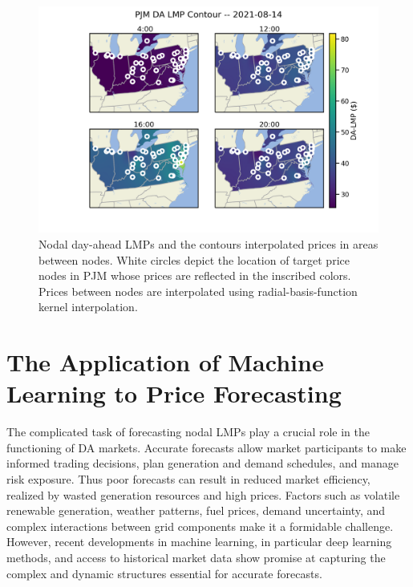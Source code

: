 \begin{figure}[htbp]
    \caption[Contour Map of PJM DA LMPs at various times on a single market-day ]{
        Nodal day-ahead LMPs and the contours interpolated prices in areas between nodes.
        White circles depict the location of target price nodes in PJM whose prices are reflected in the
        inscribed colors.
        Prices between nodes are interpolated using radial-basis-function kernel interpolation.
    }
    \begin{center}
        \setlength{\fboxsep}{0pt}%
        \setlength{\fboxrule}{1pt}%
        \includegraphics[width=150mm]{figs/pjm_lmp_contour_singlecbar}
    \end{center}
    \label{fig:contours}
\end{figure}

\section{The Application of Machine Learning to Price Forecasting}\label{sec:the-application-of-machine-learning-to-price-forecasting}

The complicated task of forecasting nodal LMPs play a crucial role in the functioning of DA markets.
Accurate forecasts allow market participants to make informed trading decisions, plan generation and demand schedules,
and manage risk exposure.
Thus poor forecasts can result in reduced market efficiency, realized by wasted generation
resources and high prices.
Factors such as volatile renewable generation, weather patterns, fuel prices, demand uncertainty, and complex
interactions between grid components make it a formidable challenge.
However, recent developments in machine learning, in particular deep learning methods, and access to historical market
data show promise at capturing the complex and dynamic structures essential for accurate forecasts.

